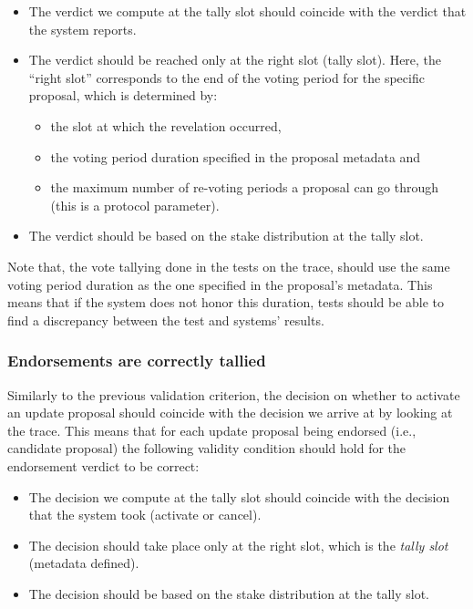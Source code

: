 \begin{itemize}
	\item The verdict we compute at the tally slot should coincide with the
	verdict	that the system reports.
	\item The verdict should be reached only at the right slot (tally slot).
	Here, the ``right slot'' corresponds to the end of the voting period for
	the specific proposal, which is determined by:
	\begin{itemize}
		\item the slot at which the revelation occurred,
		\item the voting period duration specified in the proposal metadata
		and
		\item the maximum number of re-voting periods a proposal can go
		through (this is a protocol parameter).
	\end{itemize}
	\item The verdict should be based on the stake distribution at the tally
	slot.
\end{itemize}

Note that, the vote tallying done in the tests on the trace, should use the
same voting period duration as the one specified in the proposal's metadata.
This means that if the system does not honor this duration, tests should be
able to find a discrepancy between the test and systems' results.

\subsubsection{Endorsements are correctly
	tallied}\label{vc:Endorsements_are_correctly_tallied}
Similarly to the previous validation criterion, the decision on whether to
activate an update proposal should coincide with the
decision we arrive at by looking at the trace. This means that for each update
proposal being endorsed (i.e., candidate proposal) the following validity
condition should hold for the endorsement verdict to be correct:

\begin{itemize}
	\item The decision we compute at the tally slot should coincide with the
	decision that the system took (activate or cancel).
	\item The decision should take place only at the right slot, which is the
	\emph{tally slot} (metadata defined).
	\item The decision should be based on the stake distribution at the tally
	slot.
\end{itemize}

